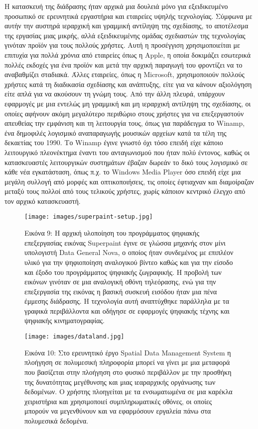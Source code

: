 \documentclass[
]{article}
\begin{document}
Η κατασκευή της διάδρασης ήταν αρχικά μια δουλειά μόνο για εξειδικευμένο
προσωπικό σε ερευνητικά εργαστήρια και εταιρείες υψηλής τεχνολογίας.
Σύμφωνα με αυτήν την αυστηρά ιεραρχική και γραμμική αντίληψη της
σχεδίασης, το αποτέλεσμα της εργασίας μιας μικρής, αλλά εξειδικευμένης
ομάδας σχεδιαστών της τεχνολογίας γινόταν προϊόν για τους πολλούς
χρήστες. Αυτή η προσέγγιση χρησιμοποιείται με επιτυχία για πολλά χρόνια
από εταιρείες όπως η Apple, η οποία δοκιμάζει εσωτερικά πολλές εκδοχές
για ένα προϊόν και μετά την αρχική παραγωγή του φροντίζει να το
αναβαθμίζει σταδιακά. Άλλες εταιρείες, όπως η Microsoft, χρησιμοποιούν
πολλούς χρήστες κατά τη διαδικασία σχεδίασης και ανάπτυξης, είτε για να
κάνουν αξιολόγηση είτε απλά για να ακούσουν τη γνώμη τους. Από την άλλη
πλευρά, υπάρχουν εφαρμογές με μια εντελώς μη γραμμική και μη ιεραρχική
αντίληψη της σχεδίασης, οι οποίες αφήνουν ακόμη μεγαλύτερο περιθώριο
στους χρήστες για να επεξεργαστούν απευθείας την εμφάνιση και τη
λειτουργία τους, όπως για παράδειγμα το Winamp, ένα δημοφιλές λογισμικό
αναπαραγωγής μουσικών αρχείων κατά τα τέλη της δεκαετίας του 1990. Το
Winamp έγινε γνωστό όχι τόσο επειδή είχε κάποιο λειτουργικό πλεονέκτημα
έναντι του ανταγωνισμού που ήταν πολύ έντονος, καθώς οι κατασκευαστές
λειτουργικών συστημάτων έβαζαν δωρεάν το δικό τους λογισμικό σε κάθε νέα
εγκατάσταση, όπως π.χ. το Windows Media Player όσο επειδή είχε μια
μεγάλη συλλογή από μορφές και οπτικοποιήσεις, τις οποίες έφτιαχναν και
διαμοίραζαν μεταξύ τους πολλοί από τους τελικούς χρήστες, χωρίς κάποιον
κεντρικό έλεγχο από τον αρχικό κατασκευαστή.

\leavevmode{}%
\begin{figure}
\hypertarget{fig:superpaint-setup}{%
\centering
\texttt{[image: images/superpaint-setup.jpg]}
\caption{Εικόνα 9: Η αρχική υλοποίηση του προγράμματος ψηφιακής
επεξεργασίας εικόνας Superpaint έγινε σε γλώσσα μηχανής στον μίνι
υπολογιστή Data General Nova, ο οποίος ήταν συνδεμένος με επιπλέον υλικό
για την ψηφιοποίηση αναλογικού βίντεο καθώς και για την είσοδο και έξοδο
του προγράμματος ψηφιακής ζωγραφικής. Η προβολή των εικόνων γινόταν σε
μια αναλογική οθόνη τηλεόρασης, ενώ για την επεξεργασία της εικόνας η
βασική συσκευή εισόδου ήταν μια πένα έμμεσης διάδρασης. Η τεχνολογία
αυτή αναπτύχθηκε παράλληλα με τα γραφικά περιβάλλοντα και οδήγησε σε
εφαρμογές ψηφιακής τέχνης και ψηφιακής
κινηματογραφίας.}\label{fig:superpaint-setup}
}
\end{figure}

\leavevmode{}%
\begin{figure}
\hypertarget{fig:dataland}{%
\centering
\texttt{[image: images/dataland.jpg]}
\caption{Εικόνα 10: Στο ερευνητικό έργο Spatial Data Management System η
πλοήγηση σε πολυμεσική πληροφορία μπορεί να γίνει με μια μεταφορά που
βασίζεται στην πλοήγηση στο φυσικό περιβάλλον με την προσθήκη της
δυνατότητας μεγέθυνσης και μιας ιεαραρχικής οργάνωσης των δεδομένων. Ο
χρήστης πλοηγείται με τα ενσωματωμένα σε μια καρέκλα χειριστήρια και
χρησιμοποιεί συμπληρωματικές οθόνες, οι οποίες μπορούν να μεγενθύνουν
και να εφαρμόσουν εργαλεία πάνω στα πολυμεσικά
δεδομένα.}\label{fig:dataland}
}
\end{figure}
\end{document}
